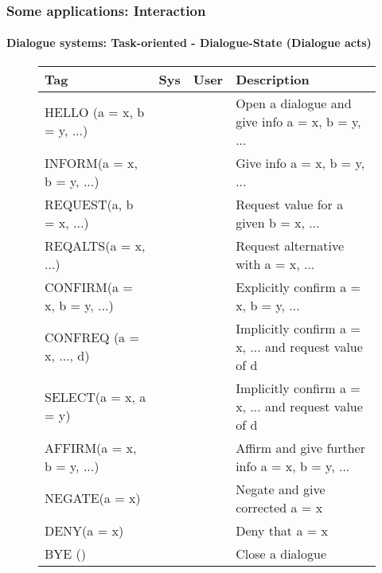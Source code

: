 \documentclass[xcolor=table]{beamer}
\begin{document}
\begin{frame}
	\frametitle{Some applications: Interaction}
	\framesubtitle{Dialogue systems: Task-oriented - Dialogue-State (Dialogue acts)}
	
	\vspace{-4pt}
	\begin{figure}
		\centering\tiny\bfseries
		\begin{tabular}{llll}
			\hline
			Tag & Sys & User & Description \\
			\hline
			HELLO (a = x, b = y, ...) & \CheckedBox & \CheckedBox & Open a dialogue and give info a = x, b = y, ... \\
			INFORM(a = x, b = y, ...) & \CheckedBox & \CheckedBox & Give info a = x, b = y, ... \\
			REQUEST(a, b = x, ...) & \CheckedBox & \CheckedBox & Request value for a given b = x, ... \\
			REQALTS(a = x, ...) & \XBox & \CheckedBox & Request alternative with a = x, ... \\
			CONFIRM(a = x, b = y, ...) & \CheckedBox & \CheckedBox & Explicitly confirm a = x, b = y, ... \\
			CONFREQ (a = x, ..., d) & \CheckedBox & \XBox & Implicitly confirm a = x, ... and request value of d \\
			SELECT(a = x, a = y) & \CheckedBox & \XBox & Implicitly confirm a = x, ... and request value of d \\
			AFFIRM(a = x, b = y, ...) & \CheckedBox & \CheckedBox & Affirm and give further info a = x, b = y, ... \\
			NEGATE(a = x) & \XBox & \CheckedBox & Negate and give corrected a = x \\
			DENY(a = x) & \XBox & \CheckedBox & Deny that a = x \\
			BYE () & \CheckedBox & \CheckedBox & Close a dialogue \\
			\hline
		\end{tabular}
	

\end{figure}
\end{frame}
\end{document}
